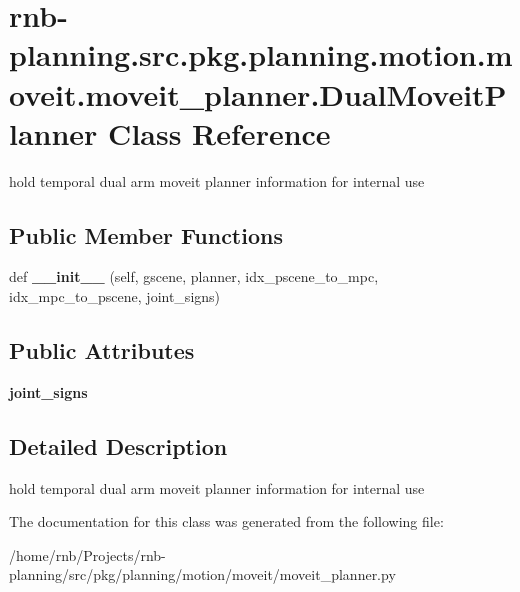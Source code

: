 \hypertarget{classrnb-planning_1_1src_1_1pkg_1_1planning_1_1motion_1_1moveit_1_1moveit__planner_1_1_dual_moveit_planner}{}\section{rnb-\/planning.src.\+pkg.\+planning.\+motion.\+moveit.\+moveit\+\_\+planner.\+Dual\+Moveit\+Planner Class Reference}
\label{classrnb-planning_1_1src_1_1pkg_1_1planning_1_1motion_1_1moveit_1_1moveit__planner_1_1_dual_moveit_planner}


hold temporal dual arm moveit planner information for internal use  


\subsection*{Public Member Functions}
\begin{DoxyCompactItemize}
\item 
\mbox{\label{classrnb-planning_1_1src_1_1pkg_1_1planning_1_1motion_1_1moveit_1_1moveit__planner_1_1_dual_moveit_planner_ad98745c04e1f72340892ea922e593e79}} 
def {\bfseries \+\_\+\+\_\+init\+\_\+\+\_\+} (self, gscene, planner, idx\+\_\+pscene\+\_\+to\+\_\+mpc, idx\+\_\+mpc\+\_\+to\+\_\+pscene, joint\+\_\+signs)
\end{DoxyCompactItemize}
\subsection*{Public Attributes}
\begin{DoxyCompactItemize}
\item 
\mbox{\label{classrnb-planning_1_1src_1_1pkg_1_1planning_1_1motion_1_1moveit_1_1moveit__planner_1_1_dual_moveit_planner_a0044a997e5ad0d408ea343e63c670f8f}} 
{\bfseries joint\+\_\+signs}
\end{DoxyCompactItemize}


\subsection{Detailed Description}
hold temporal dual arm moveit planner information for internal use 

The documentation for this class was generated from the following file\+:\begin{DoxyCompactItemize}
\item 
/home/rnb/\+Projects/rnb-\/planning/src/pkg/planning/motion/moveit/moveit\+\_\+planner.\+py\end{DoxyCompactItemize}
